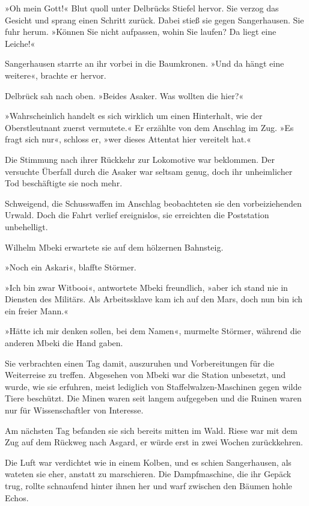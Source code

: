 \bigpar

»Oh mein Gott!« Blut quoll unter Delbrücks Stiefel hervor. Sie
verzog das Gesicht und sprang einen Schritt zurück. Dabei stieß sie
gegen Sangerhausen. Sie fuhr herum. »Können Sie nicht aufpassen,
wohin Sie laufen? Da liegt eine Leiche!«

Sangerhausen starrte an ihr vorbei in die Baumkronen. »Und da hängt
eine weitere«, brachte er hervor.

Delbrück sah nach oben. »Beides Asaker. Was wollten die hier?«

»Wahrscheinlich handelt es sich wirklich um einen Hinterhalt, wie
der Oberstleutnant zuerst vermutete.« Er erzählte von dem Anschlag
im Zug. »Es fragt sich nur«, schloss er, »wer dieses Attentat hier
vereitelt hat.«

\bigpar

Die Stimmung nach ihrer Rückkehr zur Lokomotive war beklommen. Der
versuchte Überfall durch die Asaker war seltsam genug, doch ihr
unheimlicher Tod beschäftigte sie noch mehr.

Schweigend, die Schusswaffen im Anschlag beobachteten sie den
vorbeiziehenden Urwald. Doch die Fahrt verlief ereignislos, sie
erreichten die Poststation unbehelligt.

Wilhelm Mbeki erwartete sie auf dem hölzernen Bahnsteig.

»Noch ein Askari«, blaffte Störmer.

»Ich bin zwar Witbooi«, antwortete Mbeki freundlich, »aber ich
stand nie in Diensten des Militärs. Als Arbeitssklave kam ich auf
den Mars, doch nun bin ich ein freier Mann.«

»Hätte ich mir denken sollen, bei dem Namen«, murmelte Störmer,
während die anderen Mbeki die Hand gaben.

Sie verbrachten einen Tag damit, auszuruhen und Vorbereitungen für
die Weiterreise zu treffen. Abgesehen von Mbeki war die Station
unbesetzt, und wurde, wie sie erfuhren, meist lediglich von
Staffelwalzen-Maschinen gegen wilde Tiere beschützt. Die Minen
waren seit langem aufgegeben und die Ruinen waren nur für
Wissenschaftler von Interesse.

\tb

Am nächsten Tag befanden sie sich bereits mitten im Wald. Riese war
mit dem Zug auf dem Rückweg nach Asgard, er würde erst in zwei
Wochen zurückkehren.

Die Luft war verdichtet wie in einem Kolben, und es schien
Sangerhausen, als wateten sie eher, anstatt zu marschieren. Die
Dampfmaschine, die ihr Gepäck trug, rollte schnaufend hinter ihnen
her und warf zwischen den Bäumen hohle Echos.

